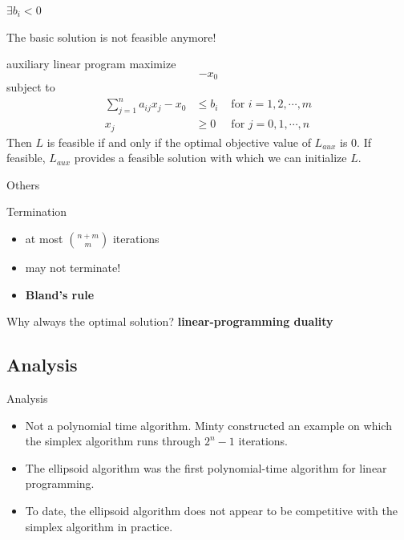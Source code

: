 \begin{frame}{$\exists b_i<0$}

    The basic solution is not feasible anymore!
    \begin{block}{auxiliary linear program}
        maximize $$-x_0$$
        subject to
        \begin{align*}
            \sum_{j=1}^n a_{ij}x_j-x_0 & \le b_i & \text{ for } i =1,2,\cdots, m \\
            x_j                        & \ge 0   & \text{ for } j = 0,1,\cdots,n
        \end{align*}
        Then $L$ is feasible if and only if the optimal objective value of $L_{aux}$ is 0.
        If feasible, $L_{aux}$ provides a feasible solution 
        with which we can initialize $L$.
    \end{block}

\end{frame}

\begin{frame}{Others}
    \begin{block}{Termination}
        \begin{itemize}
            \item at most $\binom{n + m}{m}$ iterations
            \item may not terminate!
            \item \textbf{Bland’s rule}
        \end{itemize}
    \end{block}

    \begin{block}{Why always the optimal solution?}
        \textbf{linear-programming duality}
    \end{block}
\end{frame}

\subsection{Analysis}

\begin{frame}{Analysis}

    \begin{itemize}
        \item Not a polynomial time algorithm. Minty constructed an example
              on which the simplex algorithm runs through $2^n-1$ iterations.
        \item The ellipsoid algorithm was the first polynomial-time
              algorithm for linear programming.
        \item To date, the ellipsoid algorithm does not appear to be
              competitive with the simplex algorithm in practice.
    \end{itemize}

\end{frame}
